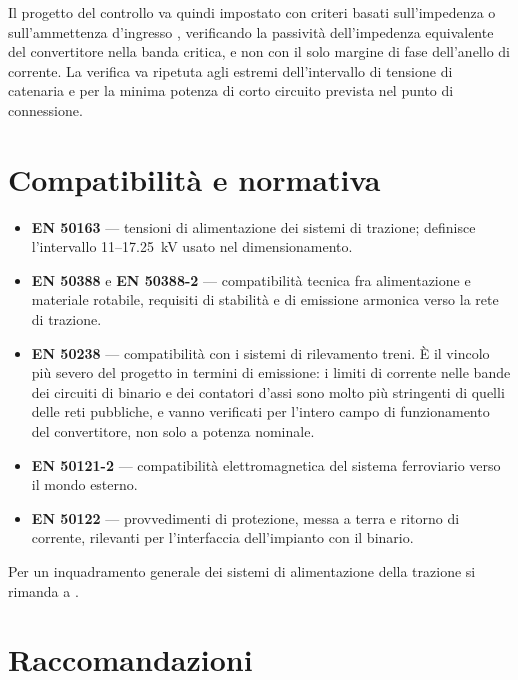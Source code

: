 \documentclass[11pt,a4paper]{article}
\begin{document}
Il progetto del controllo va quindi impostato con criteri basati sull'impedenza o
sull'ammettenza d'ingresso \cite{sun2011,harnefors2015}, verificando la passività
dell'impedenza equivalente del convertitore nella banda critica, e non con il solo
margine di fase dell'anello di corrente. La verifica va ripetuta agli estremi
dell'intervallo di tensione di catenaria e per la minima potenza di corto circuito
prevista nel punto di connessione.

\section{Compatibilità e normativa}

\begin{itemize}
\item \textbf{EN 50163} \cite{en50163} --- tensioni di alimentazione dei sistemi di
trazione; definisce l'intervallo \SI{11}{}--\SI{17.25}{\kilo\volt} usato nel
dimensionamento.
\item \textbf{EN 50388} e \textbf{EN 50388-2} \cite{en50388,en50388_2} --- compatibilità
tecnica fra alimentazione e materiale rotabile, requisiti di stabilità e di emissione
armonica verso la rete di trazione.
\item \textbf{EN 50238} \cite{en50238} --- compatibilità con i sistemi di rilevamento
treni. È il vincolo più severo del progetto in termini di emissione: i limiti di corrente
nelle bande dei circuiti di binario e dei contatori d'assi sono molto più stringenti di
quelli delle reti pubbliche, e vanno verificati per l'intero campo di funzionamento del
convertitore, non solo a potenza nominale.
\item \textbf{EN 50121-2} \cite{en50121} --- compatibilità elettromagnetica del sistema
ferroviario verso il mondo esterno.
\item \textbf{EN 50122} --- provvedimenti di protezione, messa a terra e ritorno di
corrente, rilevanti per l'interfaccia dell'impianto con il binario.
\end{itemize}

Per un inquadramento generale dei sistemi di alimentazione della trazione si rimanda a
\cite{steimel2008}.

\section{Raccomandazioni}
\end{document}
